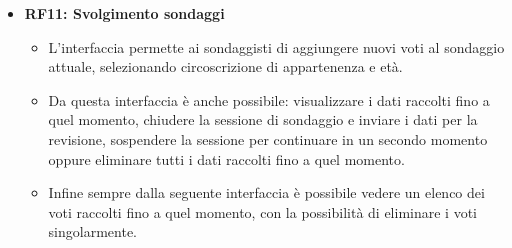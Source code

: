     \begin{itemize}
        \item \textbf{RF11: Svolgimento sondaggi} \begin{itemize}
            \item L'interfaccia permette ai sondaggisti di aggiungere nuovi voti al sondaggio attuale, selezionando circoscrizione di appartenenza e età.
            \item Da questa interfaccia è anche possibile: visualizzare i dati raccolti fino a quel momento, chiudere la sessione di sondaggio e inviare i dati per la revisione, sospendere la sessione per continuare in un secondo momento oppure eliminare tutti i dati raccolti fino a quel momento.
            \item Infine sempre dalla seguente interfaccia è possibile vedere un elenco dei voti raccolti fino a quel momento, con la possibilità di eliminare i voti singolarmente.
        \end{itemize}
    \end{itemize}
    